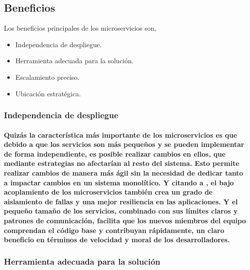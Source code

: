 \subsection{Beneficios}

Los beneficios principales de los microservicios son,
\begin{itemize}
    \item Independencia de despliegue.
    \item Herramienta adecuada para la solución.
    \item Escalamiento preciso.
    \item Ubicación estratégica.
\end{itemize}

\subsubsection{Independencia de despliegue}
\paragraph{
    Quizás la característica más importante de los microservicios es que debido a que los servicios son más pequeños y se pueden implementar de forma independiente, es posible realizar cambios en ellos, que mediante estrategias no afectarían al resto del sistema. Esto permite realizar cambios de manera más ágil sin la necesidad de dedicar tanto a impactar cambios en un sistema monolítico.
    Y citando a \cite{ibmmicroservicios}, el bajo acoplamiento de los microservicios también crea un grado de aislamiento de fallas y una mejor resiliencia en las aplicaciones. Y el pequeño tamaño de los servicios, combinado con sus límites claros y patrones de comunicación, facilita que los nuevos miembros del equipo comprendan el código base y contribuyan rápidamente, un claro beneficio en términos de velocidad y moral de los desarrolladores.
}

\subsubsection{Herramienta adecuada para la solución}
